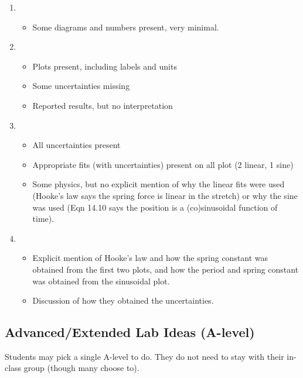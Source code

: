 \documentclass[fleqn,letterpaper]{article}
\begin{document}
\begin{enumerate}
 \item{
  \begin{itemize}
   \item{Some diagrams and numbers present, very minimal.}
  \end{itemize}
}
 \item{
  \begin{itemize}
   \item{Plots present, including labels and units}
   \item{Some uncertainties missing}
   \item{Reported results, but no interpretation}
  \end{itemize}
}
 \item{
  \begin{itemize}
   \item{All uncertainties present}
   \item{Appropriate fits (with uncertainties) present on all plot (2 linear, 1 sine)}
   \item{Some physics, but no explicit mention of why the linear fits were used (Hooke's law says the spring force is linear in the stretch) or why the sine was used (Eqn 14.10 says the position is a (co)sinusoidal function of time).}
  \end{itemize}
}
 \item{
  \begin{itemize}
   \item{Explicit mention of Hooke's law and how the spring constant was obtained from the first two plots, and how the period and spring constant was obtained from the sinusoidal plot.}
   \item{Discussion of how they obtained the uncertainties.}
  \end{itemize}
}
\end{enumerate}


\subsection*{Advanced/Extended Lab Ideas (A-level)}

Students may pick a single A-level to do.  They do not need to stay with their in-class group (though many choose to).
\end{document}
